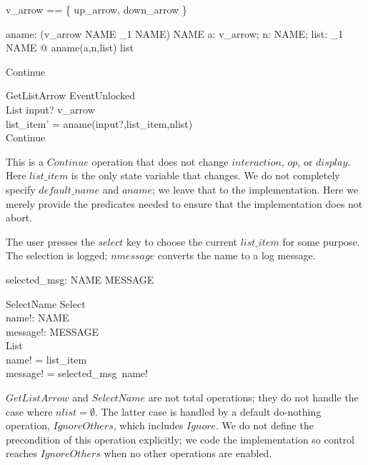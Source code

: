 \documentclass{article}
\begin{document}
\begin{zed} v\_arrow == \{ up\_arrow, down\_arrow \} \end{zed}

\begin{axdef}
	aname: (v\_arrow \cross NAME \cross \power_1 NAME) \fun NAME 
\where
	\forall a: v\_arrow; n: NAME; list: \power_1 NAME @ aname(a,n,list) \in list
\end{axdef}

\begin{zed}
Continue 
\end{zed}
\begin{schema}{GetListArrow}
	EventUnlocked \\
	\Delta List
\where
	input? \in v\_arrow \\
	list\_item' = aname(input?,list\_item,nlist) \\
	Continue \\
\end{schema}
This is a $Continue$ operation that does not change $interaction$,
$op$, or $display$.  Here $list\_item$ is the only state variable that
changes.  We do not completely specify $default\_name$ and $aname$; we
leave that to the implementation.  Here we merely provide the
predicates needed to ensure that the implementation does not abort.

The user presses the $select$ key to choose the current $list\_item$
for some purpose.  The selection is logged; $nmessage$ converts the
name to a log message.

\begin{axdef}
	selected\_msg: NAME \fun MESSAGE
\end{axdef}

\begin{schema}{SelectName}
	Select \\
	name!: NAME \\
	message!: MESSAGE \\
\where
	List \\
	name! = list\_item \\
	message! = selected\_msg~name!
\end{schema}
$GetListArrow$ and $SelectName$ are not total operations; they do not
handle the case where $nlist = \emptyset$.  The latter case is handled
by a default do-nothing operation, $IgnoreOthers$, which includes
$Ignore$.  We do not define the precondition of this operation
explicitly; we code the implementation so control reaches
$IgnoreOthers$ when no other operations are enabled.
\end{document}
